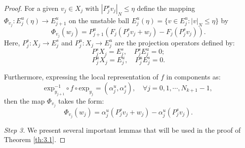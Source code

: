 \documentclass[12pt]{article}
\begin{document}
\begin{proof}
	For a given  $ v_{j}\in X_{j} $ with $ |P_{j}^{s}v_{j}|_{N}\leqslant\eta $ define the mapping  $ \Phi_{v_{j}}:E_{j}^{u}(\eta)\rightarrow E_{j+1}^{u} $ on the unstable ball $ E_{j}^{u}(\eta)=\{v\in E_{j}^{u}:|v|_{N}\leqslant\eta\} $ by
	$$
	\Phi_{v_{j}}(w_{j})=P_{j+1}^{u}(F_{j}(P_{j}^{s}v_{j}+w_{j})-F_{j}(P_{j}^{s}v_{j})).
	$$ Here, $ P_{j}^{s}:X_{j} \rightarrow E_{j}^{s}  $ and $ P_{j}^{u}:X_{j} \rightarrow E_{j}^{u} $ are the projection operators defined by:
	$$
	P_{j}^{s}X_{j}=E_{j}^{s},\quad P_{j}^{s}E_{j}^{u}=0;
	$$
	$$
	P_{j}^{u}X_{j}=E_{j}^{u},\quad P_{j}^{u}E_{j}^{s}=0.
	$$
	
	Furthermore, expressing the local representation of $ f $ in components as:
	$$
	\text{exp}_{y_{j+1}}^{-1}\circ f \circ \text{exp}_{y_{j}}=(\alpha_{j}^{u},\alpha_{j}^{s}),\quad\forall j=0,1,\cdots,N_{k+1}-1,
	$$
	then the map $\Phi_{v_j}$ takes the form:
	$$
	\Phi_{v_{j}}(w_{j})=\alpha_{j}^{u}(P_{j}^{s}v_{j}+w_{j})-\alpha_{j}^{u}(P_{j}^{s}v_{j}).
	$$
	
	{\em Step 3.} We present several important lemmas that will be used in the proof of Theorem \ref{th:3.1}.
	

\end{proof}
\end{document}
